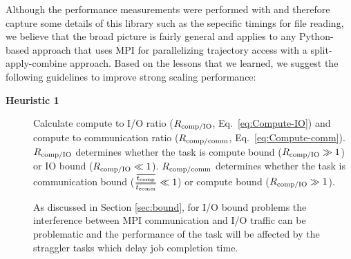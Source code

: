 \label{sec:guidelines}

Although the performance measurements were performed with  and therefore capture some details of this  library such as the sepecific timings for file reading, we believe that the broad picture is fairly general and applies to any Python-based approach that uses MPI for parallelizing trajectory access with a split-apply-combine approach.
Based on the lessons that we learned, we suggest the following guidelines to improve strong scaling performance:
\begin{description}
\item[\textbf{Heuristic 1}] Calculate compute to I/O ratio ($R_{\text{comp/IO}}$, Eq.~\ref{eq:Compute-IO}) and compute to communication ratio ($R_{\text{comp/comm}}$, Eq.~\ref{eq:Compute-comm}).
  $R_{\text{comp/IO}}$ determines whether the task is compute bound ($R_{\text{comp/IO}} \gg 1$) or IO bound ($R_{\text{comp/IO}} \ll 1$).
  $R_{\text{comp/comm}}$ determines whether the task is communication bound ($\frac{\overline{{t}_{\text{comp}}}}{\overline{t_{\text{comm}}}} \ll 1$) or compute bound ($R_{\text{comp/IO}} \gg 1$).

  As discussed in Section \ref{sec:bound}, for I/O bound problems the interference between MPI communication and I/O traffic can be problematic \cite{VMD2013, Brown:2018ab} and the performance of the task will be affected by the straggler tasks which delay job completion time.
  

\end{description}
